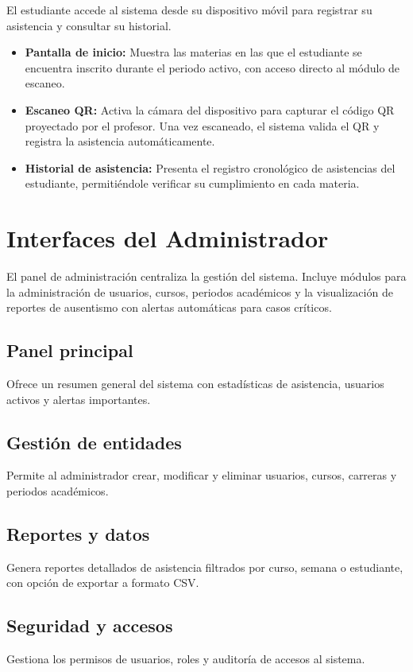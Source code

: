 \documentclass[12pt, letterpaper, oneside]{report}
\begin{document}
El estudiante accede al sistema desde su dispositivo m\'ovil para registrar su asistencia y consultar su historial.

\begin{itemize}
  \item \textbf{Pantalla de inicio:} Muestra las materias en las que el estudiante se encuentra inscrito durante el periodo activo, con acceso directo al m\'odulo de escaneo.
  \item \textbf{Escaneo QR:} Activa la c\'amara del dispositivo para capturar el c\'odigo QR proyectado por el profesor. Una vez escaneado, el sistema valida el QR y registra la asistencia autom\'aticamente.
  \item \textbf{Historial de asistencia:} Presenta el registro cronol\'ogico de asistencias del estudiante, permiti\'endole verificar su cumplimiento en cada materia.
\end{itemize}

\section{Interfaces del Administrador}

El panel de administraci\'on centraliza la gesti\'on del sistema. Incluye m\'odulos para la administraci\'on de usuarios, cursos, periodos acad\'emicos y la visualizaci\'on de reportes de ausentismo con alertas autom\'aticas para casos cr\'iticos.

\subsection{Panel principal}
Ofrece un resumen general del sistema con estad\'isticas de asistencia, usuarios activos y alertas importantes.

\subsection{Gesti\'on de entidades}
Permite al administrador crear, modificar y eliminar usuarios, cursos, carreras y periodos acad\'emicos.

\subsection{Reportes y datos}
Genera reportes detallados de asistencia filtrados por curso, semana o estudiante, con opci\'on de exportar a formato CSV.

\subsection{Seguridad y accesos}
Gestiona los permisos de usuarios, roles y auditor\'ia de accesos al sistema.
\end{document}
